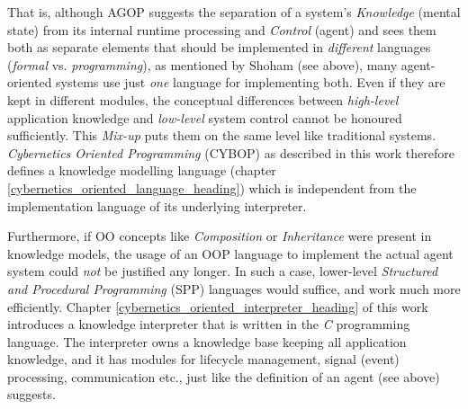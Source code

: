 That is, although AGOP suggests the separation of a system's \emph{Knowledge}
(mental state) from its internal runtime processing and \emph{Control} (agent)
and sees them both as separate elements that should be implemented in
\emph{different} languages (\emph{formal} vs. \emph{programming}), as mentioned
by Shoham (see above), many agent-oriented systems use just \emph{one} language
for implementing both. Even if they are kept in different modules, the conceptual
differences between \emph{high-level} application knowledge and \emph{low-level}
system control cannot be honoured sufficiently. This \emph{Mix-up} puts them on
the same level like traditional systems. \emph{Cybernetics Oriented Programming}
(CYBOP) as described in this work therefore defines a knowledge modelling
language (chapter \ref{cybernetics_oriented_language_heading}) which is
independent from the implementation language of its underlying interpreter.

Furthermore, if OO concepts like \emph{Composition} or \emph{Inheritance} were
present in knowledge models, the usage of an OOP language to implement the actual
agent system could \emph{not} be justified any longer. In such a case, lower-level
\emph{Structured and Procedural Programming} (SPP) languages would suffice, and
work much more efficiently. Chapter \ref{cybernetics_oriented_interpreter_heading}
of this work introduces a knowledge interpreter that is written in the \emph{C}
programming language. The interpreter owns a knowledge base keeping all
application knowledge, and it has modules for lifecycle management, signal
(event) processing, communication etc., just like the definition of an agent
(see above) suggests.
